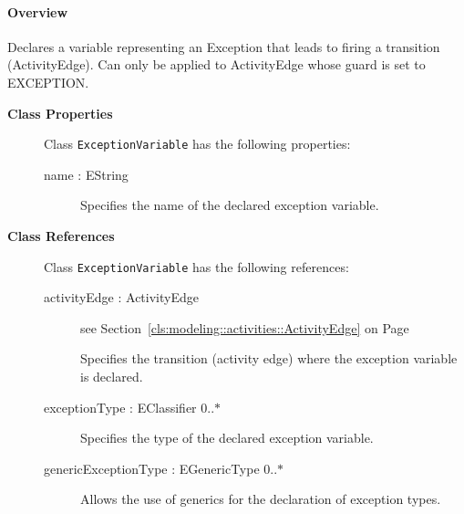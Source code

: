 \paragraph{Overview}

	
			
Declares a variable representing an Exception that leads to firing a transition (ActivityEdge). Can only be applied to ActivityEdge whose guard is set to EXCEPTION.	
		
	


\begin{description}

	\item[\textbf{Class Properties}] Class \texttt{ExceptionVariable} has the following properties:
	\begin{description}
\item[name : EString 	]

\hspace{\fill}
\nopagebreak


	
			
Specifies the name of the declared exception variable.	
		
	
	\end{description}
	
	\item[\textbf{Class References}] Class \texttt{ExceptionVariable} has the following references:
	\begin{description}
\item[activityEdge : ActivityEdge 	]
see Section~\ref{cls:modeling::activities::ActivityEdge} on Page~\pageref{cls:modeling::activities::ActivityEdge}
\hspace{\fill}
\nopagebreak


	
			
Specifies the transition (activity edge) where the exception variable is declared.	
		
	
\item[exceptionType : EClassifier 			0..$*$]

\hspace{\fill}
\nopagebreak


	
			
Specifies the type of the declared exception variable.	
		
	
\item[genericExceptionType : EGenericType 			0..$*$]

\hspace{\fill}
\nopagebreak


	
			
Allows the use of generics for the declaration of exception types.	
		
	
	\end{description}
	

\end{description}

